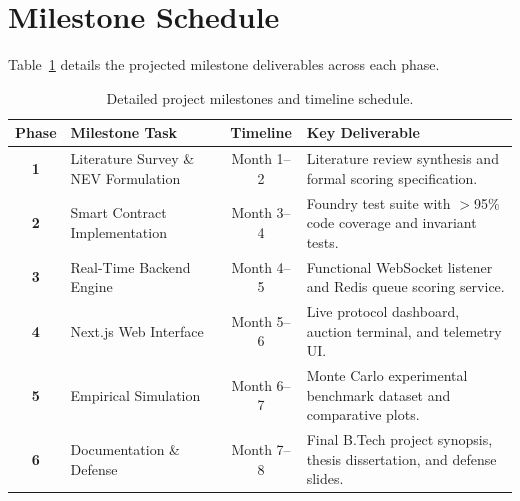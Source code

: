 \section{Milestone Schedule}
Table~\ref{tab:project_milestones} details the projected milestone deliverables across each phase.

\begin{table}[htbp]
\centering
\caption{Detailed project milestones and timeline schedule.}
\label{tab:project_milestones}
\begin{tabular}{c|p{4.5cm}|c|p{6.0cm}}
\hline
\textbf{Phase} & \textbf{Milestone Task} & \textbf{Timeline} & \textbf{Key Deliverable} \\
\hline
\textbf{1} & Literature Survey \& NEV Formulation & Month 1--2 & Literature review synthesis and formal scoring specification. \\
\hline
\textbf{2} & Smart Contract Implementation & Month 3--4 & Foundry test suite with $>$95\% code coverage and invariant tests. \\
\hline
\textbf{3} & Real-Time Backend Engine & Month 4--5 & Functional WebSocket listener and Redis queue scoring service. \\
\hline
\textbf{4} & Next.js Web Interface & Month 5--6 & Live protocol dashboard, auction terminal, and telemetry UI. \\
\hline
\textbf{5} & Empirical Simulation & Month 6--7 & Monte Carlo experimental benchmark dataset and comparative plots. \\
\hline
\textbf{6} & Documentation \& Defense & Month 7--8 & Final B.Tech project synopsis, thesis dissertation, and defense slides. \\
\hline
\end{tabular}
\end{table}
